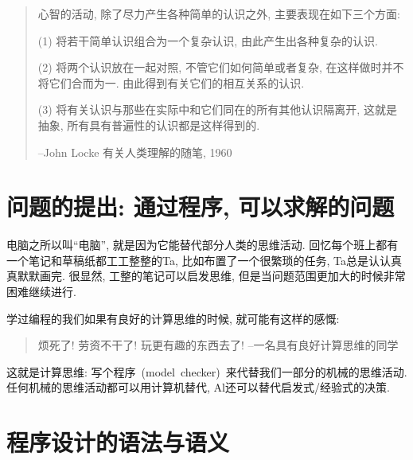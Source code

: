 \begin{quote}
	心智的活动, 除了尽力产生各种简单的认识之外, 主要表现在如下三个方面:

(1) 将若干简单认识组合为一个复杂认识, 由此产生出各种复杂的认识. 

(2) 将两个认识放在一起对照, 不管它们如何简单或者复杂, 在这样做时并不将它们合而为一. 由此得到有关它们的相互关系的认识. 

(3) 将有关认识与那些在实际中和它们同在的所有其他认识隔离开, 这就是抽象, 所有具有普遍性的认识都是这样得到的. 

\hfill --John Locke 有关人类理解的随笔, 1960

\end{quote}

\section{问题的提出: 通过程序, 可以求解的问题}

电脑之所以叫“电脑”, 就是因为它能替代部分人类的思维活动. 回忆每个班上都有一个笔记和草稿纸都工工整整的Ta, 比如布置了一个很繁琐的任务, Ta总是认认真真默默画完. 很显然, 工整的笔记可以启发思维, 但是当问题范围更加大的时候非常困难继续进行. 	

学过编程的我们如果有良好的计算思维的时候, 就可能有这样的感慨: 

\begin{quote}
	烦死了! 劳资不干了! 玩更有趣的东西去了! \hfill --一名具有良好计算思维的同学
\end{quote}

这就是计算思维: 写个程序 (model checker) 来代替我们一部分的机械的思维活动. 任何机械的思维活动都可以用计算机替代, Al还可以替代启发式/经验式的决策. 

\section{程序设计的语法与语义}

